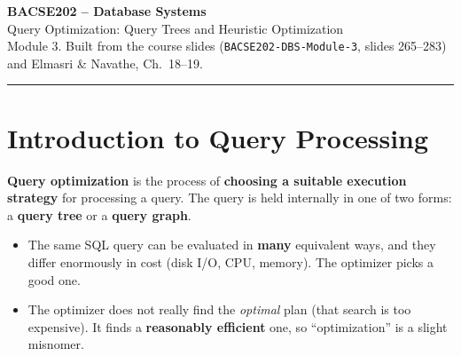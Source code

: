 \documentclass[10pt,a4paper]{article}
\begin{document}
\begin{center}
{\LARGE\bfseries BACSE202 -- Database Systems}\\[3pt]
{\Large Query Optimization: Query Trees and Heuristic Optimization}\\[3pt]
{\small Module 3. Built from the course slides (\texttt{BACSE202-DBS-Module-3}, slides 265--283) and Elmasri \& Navathe, Ch.~18--19.}
\end{center}

\tableofcontents
\vspace{4pt}\hrule

\section{Introduction to Query Processing}

\begin{keybox}
\textbf{Query optimization} is the process of \textbf{choosing a suitable execution strategy} for processing a query.
The query is held internally in one of two forms: a \textbf{query tree} or a \textbf{query graph}.
\end{keybox}

\begin{itemize}
  \item The same SQL query can be evaluated in \textbf{many} equivalent ways, and they differ enormously in cost (disk I/O, CPU, memory). The optimizer picks a good one.
  \item The optimizer does not really find the \emph{optimal} plan (that search is too expensive). It finds a \textbf{reasonably efficient} one, so ``optimization'' is a slight misnomer.
\end{itemize}
\end{document}
